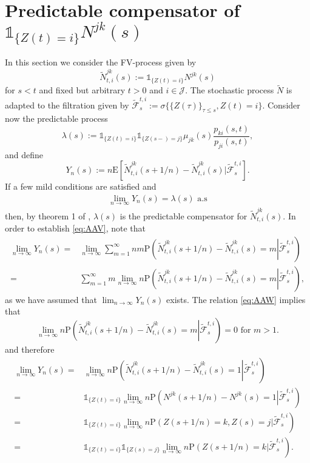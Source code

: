 \documentclass[12pt]{article}
\newcommand{\E}{\text{E}}
\newcommand{\indic}[1]{\mathds{1}_{ \{ #1 \} }}
\renewcommand{\P}{\text{P}}
\theoremstyle{my_thm}
\begin{document}
\section{Predictable compensator of $\indic{Z(t)=i} N^{jk}(s)$} \label{sec:pred}
In this section we consider the FV-process given by
$$
\tilde{N}^{jk}_{t,i}(s):=\indic{Z(t)=i} N^{jk}(s)
$$
for $s<t$ and fixed but arbitrary $t>0$ and $i \in \mathcal{J}$. The stochastic process $\tilde{N}$ is adapted to the filtration given by $\tilde{\mathcal{F}}_s^{t,i} := \sigma \{ \{Z(\tau) \}_{\tau\leq s}, Z(t)=i \}$. Consider now the predictable process
$$
\lambda(s):=\indic{Z(t)=i}\indic{Z(s-)=j}\mu_{jk}(s) \frac{p_{ki}(s,t)}{p_{ji}(s,t)},
$$
and define
$$
Y_n(s) := n\E\left[ \tilde{N}_{t,i}^{jk}(s+1/n)-\tilde{N}_{t,i}^{jk}(s)|\tilde{\mathcal{F}}_s^{t,i} \right].
$$
If a few mild conditions are satisfied and
\begin{align}
\lim_{n \rightarrow \infty} Y_n(s)=\lambda(s) \text{ a.s} \label{eq:AAV}
\end{align}
then, by theorem 1 of \citet{AvenT}, $\lambda(s)$ is the predictable compensator for $\tilde{N}^{jk}_{t,i}(s)$.
In order to establish \eqref{eq:AAV}, note that 
\begin{align*}
\lim_{n\rightarrow \infty} Y_n(s)=& \lim_{n\rightarrow \infty}  \sum_{m=1}^{\infty} n m \P \left. \left( \tilde{N}_{t,i}^{jk}(s+1/n)-\tilde{N}_{t,i}^{jk}(s) = m \right| \tilde{\mathcal{F}}_s^{t,i}  \right)
\\
=&
\sum_{m=1}^{\infty} m \lim_{n\rightarrow \infty} n \P \left. \left( \tilde{N}_{t,i}^{jk}(s+1/n)-\tilde{N}_{t,i}^{jk}(s) = m \right| \tilde{\mathcal{F}}_s^{t,i}  \right)
,
\end{align*}
as we have assumed that $\lim_{n\rightarrow \infty} Y_n(s)$ exists. The relation \eqref{eq:AAW} implies that
$$
\lim_{n\rightarrow \infty} n \P \left. \left( \tilde{N}_{t,i}^{jk}(s+1/n)-\tilde{N}_{t,i}^{jk}(s) = m \right| \tilde{\mathcal{F}}_s^{t,i}  \right) = 0 \text{ for } m >1.
$$
and therefore
\begin{align*}
\lim_{n\rightarrow \infty} Y_n(s) =& \lim_{n\rightarrow \infty} n \P \left. \left( \tilde{N}_{t,i}^{jk}(s+1/n)-\tilde{N}_{t,i}^{jk}(s) = 1 \right| \tilde{\mathcal{F}}_s^{t,i}  \right)
\\
=&
\indic{Z(t)=i}  \lim_{n\rightarrow \infty} n \P \left. \left( N^{jk}(s+1/n)-N^{jk}(s) = 1 \right| \tilde{\mathcal{F}}_s^{t,i}  \right)
\\
=&
\indic{Z(t)=i}  \lim_{n\rightarrow \infty} n \P \left. \left( Z(s+1/n)=k, Z(s)=j \right| \tilde{\mathcal{F}}_s^{t,i}  \right)
\\
=&
\indic{Z(t)=i} \indic{Z(s)=j} \lim_{n\rightarrow \infty} n \P \left. \left( Z(s+1/n)=k \right| \tilde{\mathcal{F}}_s^{t,i}  \right).
\end{align*}
\end{document}
